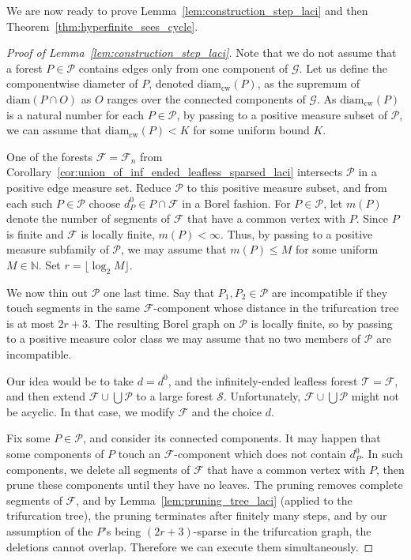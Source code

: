 \documentclass{article}
\theoremstyle{plain}
\theoremstyle{definition}
\newcommand{\N}{\mathbb{N}}
\newcommand{\cG}{\mathcal{G}}
\newcommand{\cS}{\mathcal{S}}
\newcommand{\cF}{\mathcal{F}}
\newcommand{\mP}{\mathscr P}
\newcommand{\cT}{\mathcal{T}}
\begin{document}
We are now ready to prove Lemma~\ref{lem:construction_step_laci} and then Theorem~\ref{thm:hyperfinite_sees_cycle}.

\begin{proof}[Proof of Lemma~\ref{lem:construction_step_laci}] 
Note that we do not assume that a forest $P \in \mP$ contains edges only from one component of $\cG$. Let us define the componentwise diameter of $P$, denoted $\text{diam}_{\text{cw}}(P)$, as the supremum of $\text{diam}(P \cap O)$ as $O$ ranges over the connected components of $\cG$. As $\text{diam}_{\text{cw}}(P)$ is a natural number for each $P \in \mP$, by passing to a positive measure subset of $\mathscr P$, we can assume that $\text{diam}_{\text{cw}}(P) < K$ for some uniform bound $K$.


One of the forests $\cF=\cF_n$ from Corollary~\ref{cor:union_of_inf_ended_leafless_sparsed_laci} intersects $\mathscr P$ in a positive edge measure set. Reduce $\mathscr P$ to this positive measure subset, and from each such $P\in\mathscr P$ choose $d^0_P\in P\cap \cF$ in a Borel fashion.  For $P\in\mathscr P$, let $m(P)$ denote the number of segments of $\cF$ that have a common vertex with $P$. Since $P$ is finite and $\cF$ is locally finite, $m(P)<\infty$. Thus, by passing to a positive measure subfamily of $\mathscr P$, we may assume that $m(P)\leq M$ for some uniform $M\in\N$. Set $r= \lfloor\log_2 M\rfloor$.

We now thin out $\mathscr P$ one last time. Say that $P_1,P_2\in\mathscr P$ are incompatible if they touch segments in the same $\cF$-component whose distance in the trifurcation tree is at most $2r+3$. The resulting Borel graph on $\mathscr P$ is locally finite, so by passing to a positive measure color class we may assume that no two members of $\mathscr P$ are incompatible.

Our idea would be to take $d = d^0$, and the infinitely-ended leafless forest $\cT=\cF$, and then extend $\cF \cup \bigcup\mP$ to a large forest $\cS$. Unfortunately, $\cF\cup \bigcup\mP$ might not be acyclic. In that case, we modify $\cF$ and the choice $d$.

Fix some $P \in \mP$, and consider its connected components. It may happen that some components of $P$ touch an $\cF$-component which does not contain $d^0_P$. In such components, we delete all segments of $\cF$ that have a common vertex with $P$, then prune these components until they have no leaves. The pruning removes complete segments of $\cF$, and by Lemma~\ref{lem:pruning_tree_laci} (applied to the trifurcation tree), the pruning terminates after finitely many steps, and by our assumption of the $P$'s being $(2r+3)$-sparse in the trifurcation graph, the deletions cannot overlap. Therefore we can execute them simultaneously.


\end{proof}
\end{document}
